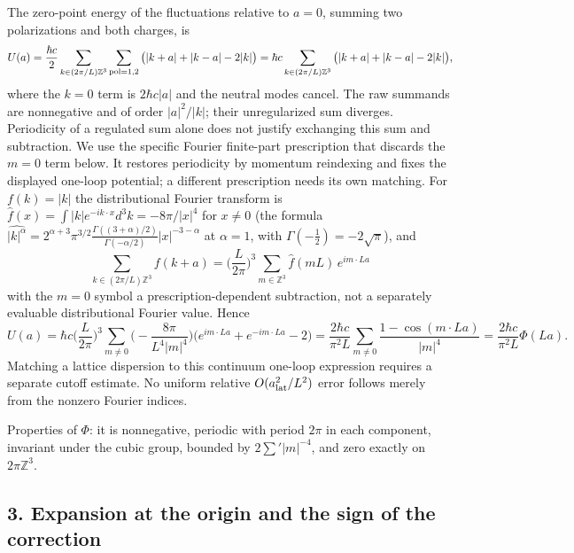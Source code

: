 \documentclass[11pt,a4paper]{article}
\begin{document}
The zero-point energy of the fluctuations relative to \(a=0\), summing
two polarizations and both charges, is
\[U(a)=\frac{\hbar c}2\sum_{k\in(2\pi/L)\mathbb Z^3}\sum_{\rm pol=1,2}\big(|k+a|+|k-a|-2|k|\big) =\hbar c\sum_{k\in(2\pi/L)\mathbb Z^3}\big(|k+a|+|k-a|-2|k|\big),\]
where the \(k=0\) term is \(2\hbar c|a|\) and the neutral modes cancel.
The raw summands are nonnegative and of order \(|a|^2/|k|\); their
unregularized sum diverges. Periodicity of a regulated sum alone does
not justify exchanging this sum and subtraction. We use the specific
Fourier finite-part prescription that discards the \(m=0\) term below.
It restores periodicity by momentum reindexing and fixes the displayed
one-loop potential; a different prescription needs its own matching. For
\(f(k)=|k|\) the distributional Fourier transform is
\(\hat f(x)=\int|k|e^{-ik\cdot x}d^3k=-8\pi/|x|^4\) for \(x\ne0\) (the
formula
\(\widehat{|k|^\alpha}=2^{\alpha+3}\pi^{3/2}\frac{\Gamma((3+\alpha)/2)}{\Gamma(-\alpha/2)}|x|^{-3-\alpha}\)
at \(\alpha=1\), with \(\Gamma(-\tfrac12)=-2\sqrt\pi\)), and
\[\sum_{k\in(2\pi/L)\mathbb Z^3}f(k+a)=\Big(\frac L{2\pi}\Big)^3\sum_{m\in\mathbb Z^3}\hat f(mL)\,e^{im\cdot La}\]
with the \(m=0\) symbol a prescription-dependent subtraction, not a
separately evaluable distributional Fourier value. Hence
\[U(a)=\hbar c\Big(\frac L{2\pi}\Big)^3\sum_{m\ne0}\Big(-\frac{8\pi}{L^4|m|^4}\Big)\big(e^{im\cdot La}+e^{-im\cdot La}-2\big) =\frac{2\hbar c}{\pi^2L}\sum_{m\ne0}\frac{1-\cos(m\cdot La)}{|m|^4}=\frac{2\hbar c}{\pi^2L}\Phi(La).\]
Matching a lattice dispersion to this continuum one-loop expression
requires a separate cutoff estimate. No uniform relative
\(O(a_{\rm lat}^2/L^2)\) error follows merely from the nonzero Fourier
indices.

Properties of \(\Phi\): it is nonnegative, periodic with period \(2\pi\)
in each component, invariant under the cubic group, bounded by
\(2\sum'|m|^{-4}\), and zero exactly on \(2\pi\mathbb Z^3\).

\hypertarget{expansion-at-the-origin-and-the-sign-of-the-correction}{%
\subsection{3. Expansion at the origin and the sign of the
correction}\label{expansion-at-the-origin-and-the-sign-of-the-correction}}
\end{document}
